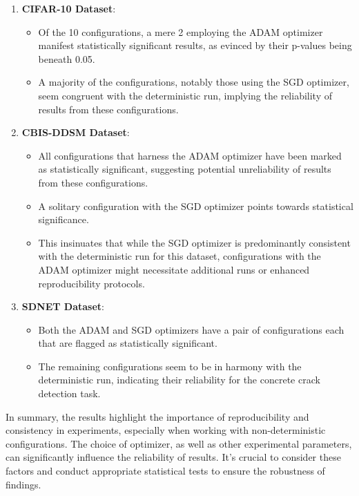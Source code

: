 \begin{enumerate}
      \item \textbf{CIFAR-10 Dataset}:
      \begin{itemize}
          \item Of the 10 configurations, a mere 2 employing the ADAM optimizer manifest statistically significant results, as evinced by their p-values being beneath 0.05.
          \item A majority of the configurations, notably those using the SGD optimizer, seem congruent with the deterministic run, implying the reliability of results from these configurations.
      \end{itemize}
      
      \item \textbf{CBIS-DDSM Dataset}:
      \begin{itemize}
          \item All configurations that harness the ADAM optimizer have been marked as statistically significant, suggesting potential unreliability of results from these configurations.
          \item A solitary configuration with the SGD optimizer points towards statistical significance.
          \item This insinuates that while the SGD optimizer is predominantly consistent with the deterministic run for this dataset, configurations with the ADAM optimizer might necessitate additional runs or enhanced reproducibility protocols.
      \end{itemize}
      
      \item \textbf{SDNET Dataset}:
      \begin{itemize}
          \item Both the ADAM and SGD optimizers have a pair of configurations each that are flagged as statistically significant.
          \item The remaining configurations seem to be in harmony with the deterministic run, indicating their reliability for the concrete crack detection task.
      \end{itemize}
  \end{enumerate}

In summary, the results highlight the importance of reproducibility and consistency in experiments, especially when working with non-deterministic configurations. The choice of optimizer, as well as other experimental parameters, can significantly influence the reliability of results. It's crucial to consider these factors and conduct appropriate statistical tests to ensure the robustness of findings.

